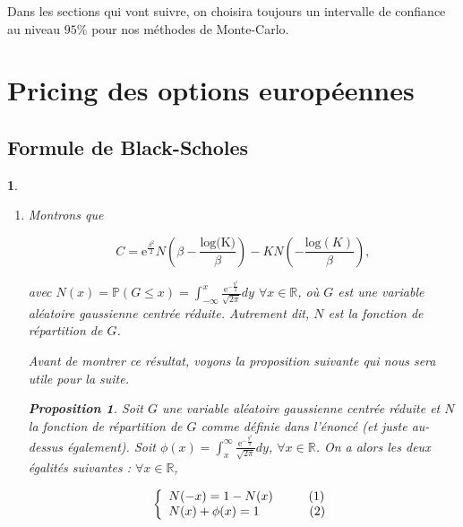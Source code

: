 \documentclass{article}
\theoremstyle{exostyle}
\newtheorem{exercice}{}
\newenvironment{questions}{
\begin{enumerate}[\hspace{12pt} 1.]}{\end{enumerate}}
\newtheorem*{prop}{Proposition}
\begin{document}
\bigbreak

\noindent Dans les sections qui vont suivre, on choisira toujours un intervalle de confiance au niveau $95 \%$ pour nos méthodes de Monte-Carlo.







\section{Pricing des options européennes}

\subsection{Formule de Black-Scholes}

\begin{exercice}

\begin{questions}

\bigbreak

\item Montrons que 

\[C = \text{e}^\frac{\beta^{2}}{2}N\left(\beta-\frac{\text{log(K)}}{\beta}\right)-KN\left(-\frac{\text{log}(K)}{\beta}\right),\]

avec $N(x) = \mathbb{P}(G \leq x) = \int_{-\infty}^{x}\frac{\text{e}^{-\frac{y^{2}}{2}}}{\sqrt{2\pi}}dy$ $\forall x \in \mathbb{R}$, où $G$ est une variable aléatoire gaussienne centrée réduite. Autrement dit, $N$ est la fonction de répartition de $G$.

\bigbreak
\bigbreak

Avant de montrer ce résultat, voyons la proposition suivante qui nous sera utile pour la suite.
\begin{prop}
Soit $G$ une variable aléatoire gaussienne centrée réduite et $N$ la fonction de répartition de $G$ comme définie dans l'énoncé (et juste au-dessus également). Soit $\phi(x) = \int_{x}^{\infty}\frac{\text{e}^{-\frac{y^{2}}{2}}}{\sqrt{2\pi}}dy$, $\forall x \in \mathbb{R}$. On a alors les deux égalités suivantes : $\forall x \in \mathbb{R}$,

\[\left\{
  \begin{array}{lll}
    N(-x) = 1 - N(x) \hspace{1cm} (1)\\
    N(x) + \phi(x) = 1 \hspace{1.406cm} (2)
    \end{array}
\right.\]


\end{prop}
\end{questions}
\end{exercice}
\end{document}
